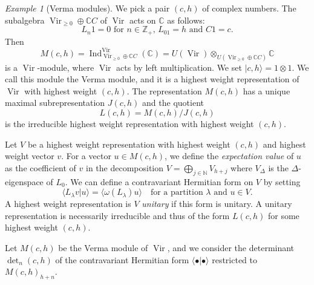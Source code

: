 \documentclass[notheorems]{beamer}
\theoremstyle{remark}
\newtheorem{example}{Example}
\DeclareMathOperator{\Vir}{Vir}
\DeclareMathOperator{\Ind}{Ind}
\begin{document}
\begin{frame}
  \begin{example}[Verma modules]
    \label{exa:4}
    We pick a pair $(c, h)$ of complex numbers.
    The subalgebra $\Vir_{\ge 0} \oplus \mathbb{C}C$ of $\Vir$ acts on $\mathbb{C}$ as follows:
    \begin{equation*}
      \text{$L_n1 = 0$ for $n \in \mathbb{Z}_+$, $L_01 = h$ and $C1 = c$}.
    \end{equation*}
    Then
    \begin{equation*}
      M(c, h) = \Ind^{\Vir}_{\Vir_{\ge 0} \oplus \mathbb{C}C}(\mathbb{C}) = U(\Vir) \otimes_{U(\Vir_{\ge 0} \oplus \mathbb{C}C)} \mathbb{C}
    \end{equation*}
    is a $\Vir$-module, where $\Vir$ acts by left multiplication.
    We set $|c, h\rangle = 1\otimes1$.
    We call this module the Verma module, and it is a highest weight representation of $\Vir$ with highest weight $(c, h)$.
    The representation $M(c, h)$ has a unique maximal subrepresentation $J(c, h)$ and the quotient
    \begin{equation*}
      L(c, h) = M(c, h)/J(c, h)
    \end{equation*}
    is the irreducible highest weight representation with highest weight $(c, h)$.
  \end{example}
\end{frame}

\begin{frame}
  Let $V$ be a highest weight representation with highest weight $(c, h)$ and highest weight vector $v$.
  For a vector $u \in M(c, h)$, we define the \emph{expectation value} of $u$ as the coefficient of $v$ in the decomposition $V = \bigoplus_{j \in \mathbb{N}}V_{h + j}$ where $V_{\Delta}$ is the $\Delta$-eigenspace of $L_0$.
  We can define a contravariant Hermitian form on $V$ by setting
  \begin{equation}
    \label{eq:7}
    \langle L_{\lambda}v| u\rangle = \langle\omega(L_{\lambda})u\rangle \quad \text{for a partition $\lambda$ and $u \in V$}.
  \end{equation}
  A highest weight representation is $V$ \emph{unitary} if this form is unitary.
  A unitary representation is necessarily irreducible and thus of the form $L(c, h)$ for some highest weight $(c, h)$.

  Let $M(c, h)$ be the Verma module of $\Vir$, and we consider the determinant $\det_n(c, h)$ of the contravariant Hermitian form $\langle\bullet| \bullet\rangle$ restricted to $M(c, h)_{h + n}$.
\end{frame}
\end{document}
